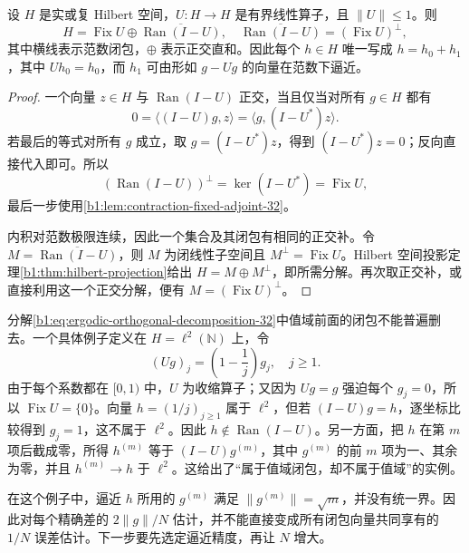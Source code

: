 \begin{proposition}[不动空间与差的值域]\label{b1:prop:ergodic-orthogonal-decomposition-32}
设 \(H\) 是实或复 Hilbert 空间，\(U\colon H\rightarrow H\) 是有界线性算子，且 \(\|U\|\leq1\)。则
\begin{equation}\label{b1:eq:ergodic-orthogonal-decomposition-32}
 H=\operatorname{Fix}U\oplus\overline{\operatorname{Ran}(I-U)},
 \quad
 \overline{\operatorname{Ran}(I-U)}=(\operatorname{Fix}U)^\perp,
\end{equation}
其中横线表示范数闭包，\(\oplus\) 表示正交直和。因此每个 \(h\in H\) 唯一写成 \(h=h_0+h_1\)，其中 \(Uh_0=h_0\)，而 \(h_1\) 可由形如 \(g-Ug\) 的向量在范数下逼近。
\end{proposition}
\begin{proof}
一个向量 \(z\in H\) 与 \(\operatorname{Ran}(I-U)\) 正交，当且仅当对所有 \(g\in H\) 都有
\[
 0=\langle(I-U)g,z\rangle=\langle g,(I-U^*)z\rangle.
\]
若最后的等式对所有 \(g\) 成立，取 \(g=(I-U^*)z\)，得到 \((I-U^*)z=0\)；反向直接代入即可。所以
\[
 (\operatorname{Ran}(I-U))^\perp
 =\ker(I-U^*)=\operatorname{Fix}U,
\]
最后一步使用\cref{b1:lem:contraction-fixed-adjoint-32}。

内积对范数极限连续，因此一个集合及其闭包有相同的正交补。令 \(M=\overline{\operatorname{Ran}(I-U)}\)，则 \(M\) 为闭线性子空间且 \(M^\perp=\operatorname{Fix}U\)。Hilbert 空间投影定理\cref{b1:thm:hilbert-projection}给出 \(H=M\oplus M^\perp\)，即所需分解。再次取正交补，或直接利用这一个正交分解，便有 \(M=(\operatorname{Fix}U)^\perp\)。
\end{proof}

分解\eqref{b1:eq:ergodic-orthogonal-decomposition-32}中值域前面的闭包不能普遍删去。一个具体例子定义在 \(H=\ell^2(\mathbb N)\) 上，令
\[
 (Ug)_j=\left(1-\frac1j\right)g_j,\quad j\geq1.
\]
由于每个系数都在 \([0,1)\) 中，\(U\) 为收缩算子；又因为 \(Ug=g\) 强迫每个 \(g_j=0\)，所以 \(\operatorname{Fix}U=\{0\}\)。向量 \(h=(1/j)_{j\geq1}\) 属于 \(\ell^2\)，但若 \((I-U)g=h\)，逐坐标比较得到 \(g_j=1\)，这不属于 \(\ell^2\)。因此 \(h\notin\operatorname{Ran}(I-U)\)。另一方面，把 \(h\) 在第 \(m\) 项后截成零，所得 \(h^{(m)}\) 等于 \((I-U)g^{(m)}\)，其中 \(g^{(m)}\) 的前 \(m\) 项为一、其余为零，并且 \(h^{(m)}\to h\) 于 \(\ell^2\)。这给出了“属于值域闭包，却不属于值域”的实例。

\ProseParagraphBreak

在这个例子中，逼近 \(h\) 所用的 \(g^{(m)}\) 满足 \(\|g^{(m)}\|=\sqrt m\)，并没有统一界。因此对每个精确差的 \(2\|g\|/N\) 估计，并不能直接变成所有闭包向量共同享有的 \(1/N\) 误差估计。下一步要先选定逼近精度，再让 \(N\) 增大。

